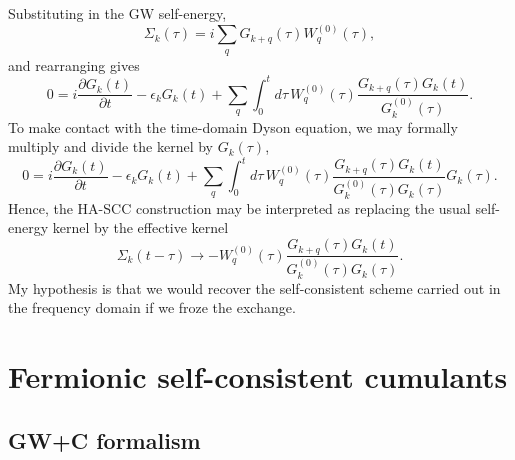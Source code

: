 Substituting in the GW self-energy,
\begin{equation}
    \Sigma_k(\tau)
    =
    i\sum_q
    G_{k+q}(\tau)W_q^{(0)}(\tau),
\end{equation}
and rearranging gives
\begin{equation}
    0
    =
    i\frac{\partial G_k(t)}{\partial t}
    -
    \epsilon_kG_k(t)
    +
    \sum_q
    \int_0^t d\tau\,
    W_q^{(0)}(\tau)
    \frac{
        G_{k+q}(\tau)G_k(t)
    }{
        G_k^{(0)}(\tau)
    }.
\label{eq:ha_eom_gw}
\end{equation}
To make contact with the time-domain Dyson equation, we may formally
multiply and divide the kernel by \(G_k(\tau)\),
\begin{equation}
    0
    =
    i\frac{\partial G_k(t)}{\partial t}
    -
    \epsilon_kG_k(t)
    +
    \sum_q
    \int_0^t d\tau\,
    W_q^{(0)}(\tau)
    \frac{
        G_{k+q}(\tau)G_k(t)
    }{
        G_k^{(0)}(\tau)G_k(\tau)
    }
    G_k(\tau).
\label{eq:ha_dyson_like}
\end{equation}
Hence, the HA-SCC construction may be interpreted as replacing the
usual self-energy kernel by the effective kernel
\begin{equation}
    \Sigma_k(t-\tau)
    \longrightarrow
    -
    W_q^{(0)}(\tau)
    \frac{
        G_{k+q}(\tau)G_k(t)
    }{
        G_k^{(0)}(\tau)G_k(\tau)
    }.
\label{eq:ha_effective_selfenergy}
\end{equation}
My hypothesis is that we would recover the self-consistent scheme carried out in the frequency domain if we froze the exchange. 
\section{Fermionic self-consistent cumulants}
\subsection{GW+C formalism}
